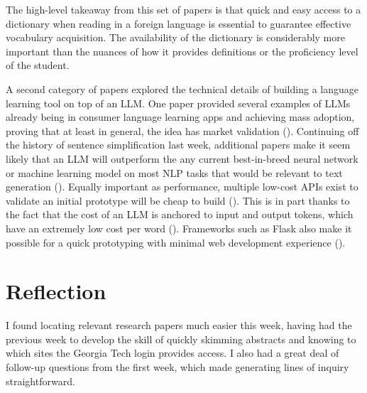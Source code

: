 \documentclass[
	letterpaper, %
]{jdf}
\newcommand{\pcite}[1]{(\cite{#1})}
\begin{document}
The high-level takeaway from this set of papers is that quick and easy access to a dictionary when reading in a foreign language is essential to guarantee effective vocabulary acquisition. The availability of the dictionary is considerably more important than the nuances of how it provides definitions or the proficiency level of the student.

A second category of papers explored the technical details of building a language learning tool on top of an LLM. One paper provided several examples of LLMs already being in consumer language learning apps and achieving mass adoption, proving that at least in general, the idea has market validation \pcite{caines2023application}. Continuing off the history of sentence simplification last week, additional papers make it seem likely that an LLM will outperform the any current best-in-breed neural network or machine learning model on most NLP tasks that would be relevant to text generation \pcite{pilán2016readable}. Equally important as performance, multiple low-cost APIs exist to validate an initial prototype will be cheap to build \pcite{mochiAPI, merriamWebsterAPI}. This is in part thanks to the fact that the cost of an LLM is anchored to input and output tokens, which have an extremely low cost per word \pcite{liu2023lost, mlq2023tokens}. Frameworks such as Flask also make it possible for a quick prototyping with minimal web development experience \pcite{ghimire2019comparative}.


\section{Reflection}
I found locating relevant research papers much easier this week, having had the previous week to develop the skill of quickly skimming abstracts and knowing to which sites the Georgia Tech login provides access. I also had a great deal of follow-up questions from the first week, which made generating lines of inquiry straightforward. 
\end{document}
